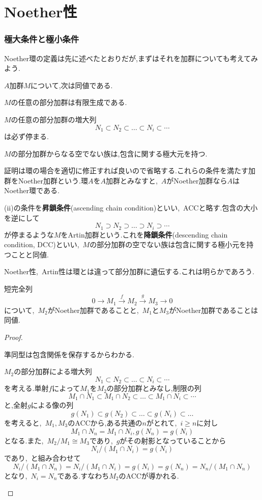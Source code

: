 \newpage
\part[Noetherian properties]{Noether性}
\section{極大条件と極小条件}
Noether環の定義は先に述べたとおりだが,まずはそれを加群についても考えてみよう.
\begin{prop}
	$A$加群$M$について,次は同値である.
	\begin{sakura}
		\item $M$の任意の部分加群は有限生成である.
		\item $M$の任意の部分加群の増大列
		\[N_1\subset N_2\subset\dots\subset N_i\subset\cdots\]
		は必ず停まる.
		\item $M$の部分加群からなる空でない族は,包含に関する極大元を持つ.
	\end{sakura}
\end{prop} 

証明は環の場合を適切に修正すれば良いので省略する.これらの条件を満たす加群をNoether加群という.環$A$を$A$加群とみなすと,~$A$がNoether加群なら$A$はNoether環である.

(ii)の条件を\textbf{昇鎖条件}(ascending chain condition)といい,~ACCと略す.包含の大小を逆にして
\[N_1\supset N_2\supset\dots\supset N_i\supset\cdots\]
が停まるような$M$をArtin加群という.これを\textbf{降鎖条件}(descending chain condition, DCC)といい,~$M$の部分加群の空でない族は包含に関する極小元を持つことと同値.

Noether性,~Artin性は環とは違って部分加群に遺伝する.これは明らかであろう.

\begin{prop}
	短完全列
	\[0\longrightarrow M_1\overset{f}{\longrightarrow}M_2\overset{g}{\longrightarrow}M_3\longrightarrow0\]
	について,~$M_2$がNoether加群であることと,~$M_1$と$M_3$がNoether加群であることは同値.
\end{prop}
\begin{proof}
	\begin{eqv}
		\item 準同型は包含関係を保存するからわかる.
		\item $M_2$の部分加群による増大列
		\[N_1\subset N_2\subset\dots\subset N_i\subset\cdots\]
		を考える.単射$f$によって$M_1$を$M_2$の部分加群とみなし,制限の列
		\[M_1\cap N_1\subset M_1\cap N_2\subset\dots\subset M_1\cap N_i\subset\cdots\]
		と,全射$g$による像の列
		\[g(N_1)\subset g(N_2)\subset\dots\subset g(N_i)\subset\dots\]
		を考えると,~$M_1,M_3$のACCから,ある共通の$n$がとれて,~$i\geq n$に対し
		\begin{equation}\label{eq:短完全列とNoether加群}
			M_1\cap N_n=M_1\cap N_i,g(N_n)=g(N_i)
		\end{equation}
		となる.また,~$M_2/M_1\cong M_3$であり,~$g$がその射影となっていることから
		\[N_i/(M_1\cap N_i)=g(N_i)\]
		であり,~と組み合わせて
		\[N_i/(M_1\cap N_n)=N_i/(M_1\cap N_i)=g(N_i)=g(N_n)=N_n/(M_1\cap N_n)\]
		となり,~$N_i=N_n$である.すなわち$M_2$のACCが導かれる.
	\end{eqv}
\end{proof}

